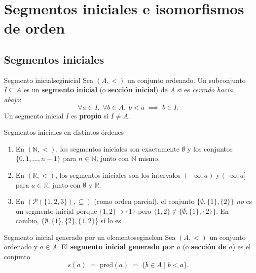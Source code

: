 \section{Segmentos iniciales e isomorfismos de orden}

\subsection{Segmentos iniciales}

\begin{definicion}{Segmento inicial}{seginicial}
Sea $(A, <)$ un conjunto ordenado. Un subconjunto $I \subseteq A$ es un \textbf{segmento inicial} (o \textbf{sección inicial}) de $A$ si es \emph{cerrado hacia abajo}:
\[
  \forall a \in I,\; \forall b \in A,\; b < a \;\implies\; b \in I.
\]
Un segmento inicial $I$ es \textbf{propio} si $I \neq A$.
\end{definicion}

\begin{ejemplo}{Segmentos iniciales en distintos órdenes}{}
\begin{enumerate}[leftmargin=2em, label=(\alph*)]
  \item En $(\mathbb{N}, <)$, los segmentos iniciales son exactamente $\emptyset$ y los conjuntos $\{0, 1, \ldots, n-1\}$ para $n \in \mathbb{N}$, junto con $\mathbb{N}$ mismo.

  \item En $(\mathbb{R}, <)$, los segmentos iniciales son los intervalos $(-\infty, a)$ y $(-\infty, a]$ para $a \in \mathbb{R}$, junto con $\emptyset$ y $\mathbb{R}$.

  \item En $(\mathcal{P}(\{1,2,3\}), \subsetneq)$ (como orden parcial), el conjunto $\{\emptyset, \{1\}, \{2\}\}$ \emph{no} es un segmento inicial porque $\{1,2\} \supset \{1\}$ pero $\{1,2\} \notin \{\emptyset,\{1\},\{2\}\}$. En cambio, $\{\emptyset, \{1\}, \{2\}, \{1,2\}\}$ sí lo es.
\end{enumerate}
\end{ejemplo}

\begin{definicion}{Segmento inicial generado por un elemento}{seginelem}
Sea $(A, <)$ un conjunto ordenado y $a \in A$. El \textbf{segmento inicial generado por $a$} (o \textbf{sección de $a$}) es el conjunto
\[
  s(a) \;=\; \mathrm{pred}(a) \;=\; \{b \in A \mid b < a\}.
\]
\end{definicion}

